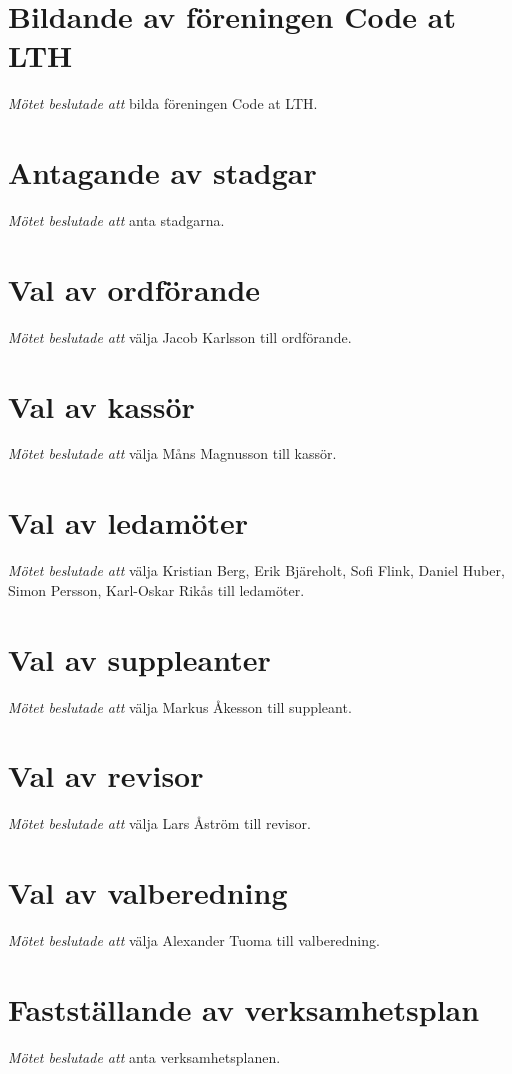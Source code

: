 \documentclass{article}
\begin{document}
\section{Bildande av föreningen Code at LTH}
\emph{Mötet beslutade att} bilda föreningen Code at LTH.

\section{Antagande av stadgar}
\emph{Mötet beslutade att} anta stadgarna.

\section{Val av ordförande}
\emph{Mötet beslutade att} välja Jacob Karlsson till ordförande.

\section{Val av kassör}
\emph{Mötet beslutade att} välja Måns Magnusson till kassör.

\section{Val av ledamöter}
\emph{Mötet beslutade att} välja Kristian Berg, Erik Bjäreholt, Sofi Flink, Daniel Huber, Simon Persson, Karl-Oskar Rikås till ledamöter.

\section{Val av suppleanter}
\emph{Mötet beslutade att} välja Markus Åkesson till suppleant.

\section{Val av revisor}
\emph{Mötet beslutade att} välja Lars Åström till revisor.

\section{Val av valberedning}
\emph{Mötet beslutade att} välja Alexander Tuoma till valberedning.

\section{Fastställande av verksamhetsplan}
\emph{Mötet beslutade att} anta verksamhetsplanen.
\end{document}
